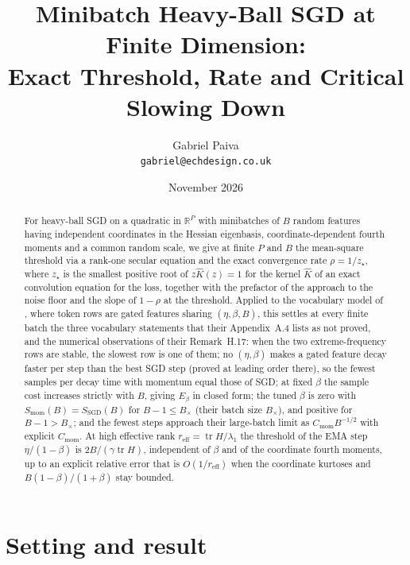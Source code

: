 \documentclass[11pt]{article}
\title{Minibatch Heavy-Ball SGD at Finite Dimension:\\ Exact Threshold, Rate and Critical Slowing Down}
\author{Gabriel Paiva\\ \texttt{gabriel@echdesign.co.uk}}
\date{November 2026}
\newcommand{\R}{\mathbb{R}}
\newcommand{\tr}{\operatorname{tr}}
\begin{document}
\maketitle

\begin{abstract}
For heavy-ball SGD on a quadratic in $\R^P$ with minibatches of $B$ random features having independent coordinates in the Hessian eigenbasis, coordinate-dependent fourth moments and a common random scale, we give at finite $P$ and $B$ the mean-square threshold via a rank-one secular equation and the exact convergence rate $\rho=1/z_\star$, where $z_\star$ is the smallest positive root of $z\widehat K(z)=1$ for the kernel $\widehat K$ of an exact convolution equation for the loss, together with the prefactor of the approach to the noise floor and the slope of $1-\rho$ at the threshold. Applied to the vocabulary model of \citet{everett2026sparse}, where token rows are gated features sharing $(\eta,\beta,B)$, this settles at every finite batch the three vocabulary statements that their Appendix~A.4 lists as not proved, and the numerical observations of their Remark~H.17: when the two extreme-frequency rows are stable, the slowest row is one of them; no $(\eta,\beta)$ makes a gated feature decay faster per step than the best SGD step (proved at leading order there), so the fewest samples per decay time with momentum equal those of SGD; at fixed $\beta$ the sample cost increases strictly with $B$, giving $E_\beta$ in closed form; the tuned $\beta$ is zero with $S_{\mathrm{mom}}(B)=S_{\mathrm{SGD}}(B)$ for $B-1\le B_\times$ (their batch size $B_\times$), and positive for $B-1>B_\times$; and the fewest steps approach their large-batch limit as $C_{\mathrm{mom}}B^{-1/2}$ with explicit $C_{\mathrm{mom}}$. At high effective rank $r_{\mathrm{eff}}=\tr H/\lambda_1$ the threshold of the EMA step $\eta/(1-\beta)$ is $2B/(\gamma\tr H)$, independent of $\beta$ and of the coordinate fourth moments, up to an explicit relative error that is $O(1/r_{\mathrm{eff}})$ when the coordinate kurtoses and $B(1-\beta)/(1+\beta)$ stay bounded.
\end{abstract}

\section{Setting and result}
\end{document}
